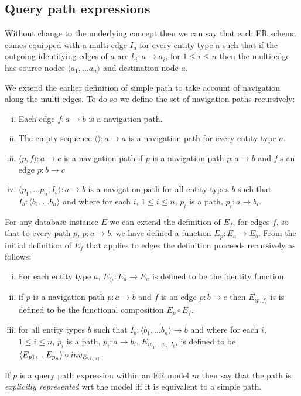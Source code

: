 \documentclass[10pt,a4paper]{article}
\newcommand{\genericmodel}{\mathcal{M}}
\renewcommand{\genericmodel}{{m}}
\newcommand{\term}[1]{\textit{{#1}}}
\begin{document}
\subsection{Query path expressions}
\noindent Without change to the underlying concept then we can say that each ER schema comes equipped with a multi-edge $I_a$ for every entity type a such that if 
the outgoing identifying edges of $a$ are $k_i: a \rightarrow a_i$, for $1 \leq i \leq n$  then the multi-edge has source nodes $\langle a_1,...a_n\rangle$ and destination node $a$.  

\noindent We extend the earlier  definition of simple path to take account of navigation along the multi-edges. To do so we define the set of navigation paths recursively:

\begin{enumerate} [(i)]
\item{ Each edge $f: a \rightarrow b$ is a navigation path.
}
\item{ The empty sequence  $\langle \rangle : a \rightarrow a$ is a navigation path for every entity type $a$.
}
\item{ $\langle p,f \rangle : a \rightarrow c$ is a navigation path  if $p$ is a navigation path $p: a \rightarrow b$ and $f $is an edge $p: b \rightarrow c$
}
\item{ $\langle p_1,...p_n,I_b\rangle : a \rightarrow b$ is a navigation path for all entity types $b$ such that $I_b: \langle b_1,...b_n\rangle$ and where
for each $i$, $1 \leq i \leq n$, $p_i$ is a path, $p_i: a \rightarrow b_i$.   
}
\end{enumerate}

\noindent For any database instance $E$ we can  extend  the definition of
$E_f$, for edges $f$,  so that to every path $p$, $p: a \rightarrow b$,  we have defined a function $E_p: E_a \rightarrow E_b$. From the initial definition of $E_f$ that applies to 
edges the definition proceeds recursively as follows: 
\begin{enumerate} [(i)]
\item{  For each entity type $a$, $E_{\langle \rangle}: E_a \rightarrow E_a$ is defined to be the identity function.
}

\item{   if $p$ is a navigation path $p: a \rightarrow b$ and $f$ is an edge $p: b \rightarrow c$ then $E_{\langle p,f \rangle}$ is 
is defined to be the functional composition $E_p \circ E_f$.
}

\item{ for all entity types $b$ such that $I_b: \langle b_1,...b_n\rangle \rightarrow b$ and where
for each $i$, $1 \leq i \leq n$, $p_i$ is a path, $p_i: a \rightarrow b_i$, $E_{\langle p_1,...p_n,I_b\rangle}$ is defined to be 
$\langle E_{p1},...E_{p_n} \rangle \circ inv_{E_{\i{b}}}$.
}
\end{enumerate}
\noindent If $p$ is a query path expression within an ER model $\genericmodel$ then say that the path is \term{explicitly represented} wrt the model iff it is equivalent to a simple path. \\
\end{document}
